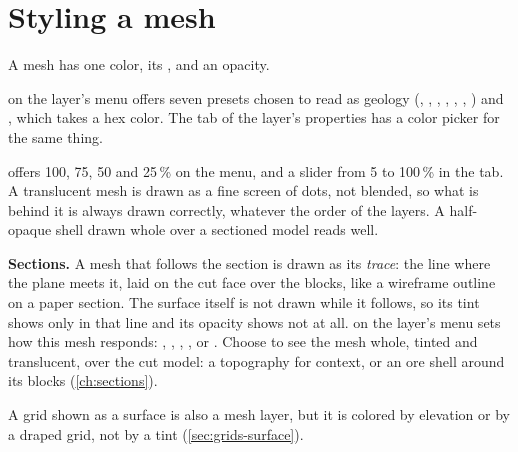 \section{Styling a mesh}\label{sec:meshes-style}

A mesh has one color, its , and an opacity.

 on the layer's menu offers seven presets chosen to read as geology (, , , , , , ) and , which takes a hex color. The  tab of the layer's properties has a color picker for the same thing.

 offers 100, 75, 50 and 25\,\% on the menu, and a slider from 5 to 100\,\% in the  tab. A translucent mesh is drawn as a fine screen of dots, not blended, so what is behind it is always drawn correctly, whatever the order of the layers. A half-opaque shell drawn whole over a sectioned model reads well.

\textbf{Sections.} A mesh that follows the section is drawn as its \emph{trace}: the line where the plane meets it, laid on the cut face over the blocks, like a wireframe outline on a paper section. The surface itself is not drawn while it follows, so its tint shows only in that line and its opacity shows not at all.  on the layer's menu sets how this mesh responds: , , , , or . Choose  to see the mesh whole, tinted and translucent, over the cut model: a topography for context, or an ore shell around its blocks (\cref{ch:sections}).


A grid shown as a surface is also a mesh layer, but it is colored by elevation or by a draped grid, not by a tint (\cref{sec:grids-surface}).

